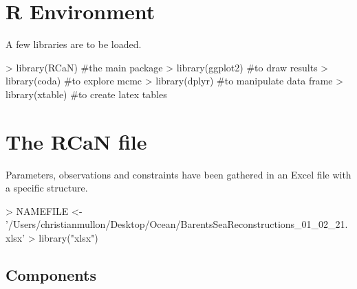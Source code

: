 \documentclass{article}
\begin{document}


\section{R Environment}
A few libraries are to be loaded.

\begin{Schunk}
\begin{Sinput}
> library(RCaN) #the main package
> library(ggplot2) #to draw results
> library(coda) #to explore mcmc 
> library(dplyr) #to manipulate data frame
> library(xtable) #to create latex tables
\end{Sinput}
\end{Schunk}

\section{The RCaN file}
Parameters, observations and constraints have been gathered in an Excel file with a specific structure. 

\begin{Schunk}
\begin{Sinput}
> NAMEFILE <- '/Users/christianmullon/Desktop/Ocean/BarentsSeaReconstructions_01_02_21.xlsx'
> library("xlsx")
\end{Sinput}
\end{Schunk}

\subsection{Components}
\end{document}
